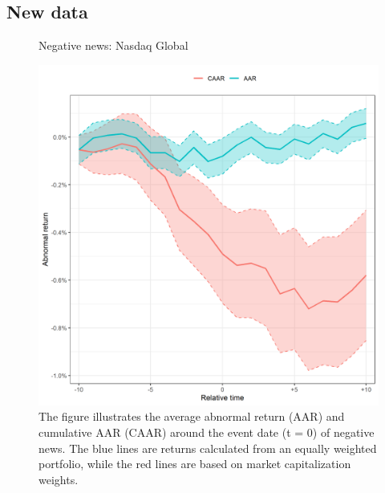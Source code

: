 \subsection{New data}

\begin{figure}[H]
    \centering
    \caption{Negative news: Nasdaq Global}
    \includegraphics[scale=0.6]{Projekt/1.Figures analysis/ST_negative_all_CI_nasdaq.png}
     \caption*{\footnotesize The figure illustrates the average abnormal return (AAR) and cumulative AAR (CAAR) around the event date (t = 0) of negative news. The blue lines are returns calculated from an equally weighted portfolio, while the red lines are based on market capitalization weights.}
    \label{fig:ST_neg_sensitivity_weight}
\end{figure} 
